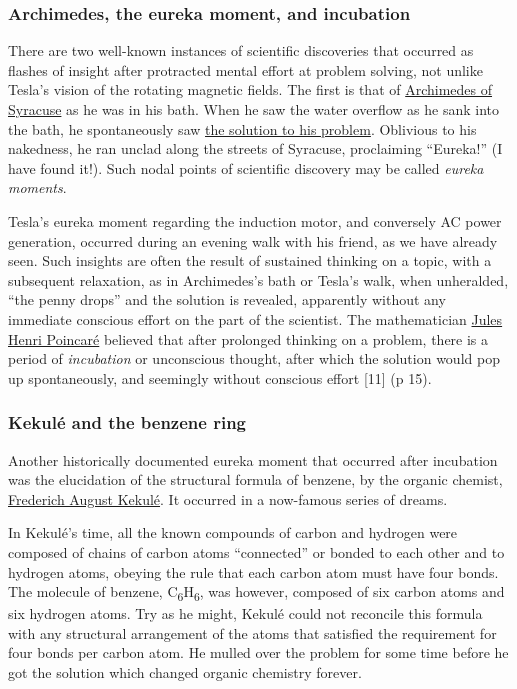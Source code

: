 \documentclass[
  11pt,
  a4paper,
]{article}
\begin{document}
\hypertarget{archimedes-the-eureka-moment-and-incubation}{%
\subsubsection{Archimedes, the eureka moment, and
incubation}\label{archimedes-the-eureka-moment-and-incubation}}

There are two well-known instances of scientific discoveries that
occurred as flashes of insight after protracted mental effort at problem
solving, not unlike Tesla's vision of the rotating magnetic fields. The
first is that of
\href{https://en.wikipedia.org/wiki/Archimedes}{Archimedes of Syracuse}
as he was in his bath. When he saw the water overflow as he sank into
the bath, he spontaneously saw
\href{https://en.wikipedia.org/wiki/Archimedes\#Archimedes'_principle}{the
solution to his problem}. Oblivious to his nakedness, he ran unclad
along the streets of Syracuse, proclaiming ``Eureka!'' (I have found
it!). Such nodal points of scientific discovery may be called
\emph{eureka moments}.

Tesla's eureka moment regarding the induction motor, and conversely AC
power generation, occurred during an evening walk with his friend, as we
have already seen. Such insights are often the result of sustained
thinking on a topic, with a subsequent relaxation, as in Archimedes's
bath or Tesla's walk, when unheralded, ``the penny drops'' and the
solution is revealed, apparently without any immediate conscious effort
on the part of the scientist. The mathematician
\href{https://en.wikipedia.org/wiki/Henri_Poincar\%C3\%A9}{Jules Henri
Poincaré} believed that after prolonged thinking on a problem, there is
a period of \emph{incubation} or unconscious thought, after which the
solution would pop up spontaneously, and seemingly without conscious
effort {[}11{]} (p 15).

\hypertarget{kekuluxe9-and-the-benzene-ring}{%
\subsubsection{Kekulé and the benzene
ring}\label{kekuluxe9-and-the-benzene-ring}}

Another historically documented eureka moment that occurred after
incubation was the elucidation of the structural formula of benzene, by
the organic chemist,
\href{https://en.wikipedia.org/wiki/August_Kekul\%C3\%A9}{Frederich
August Kekulé}. It occurred in a now-famous series of dreams.

In Kekulé's time, all the known compounds of carbon and hydrogen were
composed of chains of carbon atoms ``connected'' or bonded to each other
and to hydrogen atoms, obeying the rule that each carbon atom must have
four bonds. The molecule of benzene,
C\textsubscript{6}H\textsubscript{6}, was however, composed of six
carbon atoms and six hydrogen atoms. Try as he might, Kekulé could not
reconcile this formula with any structural arrangement of the atoms that
satisfied the requirement for four bonds per carbon atom. He mulled over
the problem for some time before he got the solution which changed
organic chemistry forever.
\end{document}
